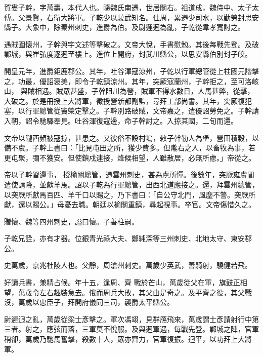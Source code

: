 \begin{pinyinscope}
 賀婁子幹，字萬壽，本代人也。隨魏氏南遷，世居關右。祖道成，魏侍中、太子太傅。父景賢，右衛大將軍。子乾少以驍武知名。仕周，累遷少司水，以勤勞封思安縣子。大象中，除秦州刺史，進爵為伯。及尉遲迥為亂，子乾從韋孝寬討之。



 遇賊圍懷州，子幹與宇文述等擊破之。文帝大悅，手書慰勉。其後每戰先登。及破鄴城，與崔弘度逐迥至樓上。進位上開府，封武川縣公，以思安縣伯別封子皎。



 開皇元年，進爵鉅鹿郡公。其年，吐谷渾寇涼州，子乾以行軍總管從上柱國元諧擊之，功最，優詔褒美，即令子乾鎮涼州。其年，突厥寇蘭州，子幹拒之，至可洛峐山，
 與賊相遇。賊眾甚盛，子幹阻川為營，賊軍不得水數日，人馬甚弊，從擊，大破之。於是冊授上大將軍，徵授營新都副監，尋拜工部尚書。其年，突厥復犯塞，以行軍總管從竇榮定擊之。子幹別路破賊，文帝嘉之，遣優詔勞免之。子幹請入朝，詔令馳驛奉見。吐谷渾復寇邊，命子幹討之。入掠其國，二旬而還。



 文帝以隴西頻被寇掠，甚患之。又彼俗不設村塢，敕子幹勒人為堡，營田積穀，以備不虞。子幹上書曰：「比見屯田之所，獲少費多。但隴右之人，以畜牧為事，若更屯聚，彌不獲安。但使鎮戍連接，烽候相望，人雖散居，必無所慮。」帝從之。



 帝以子幹習邊事，
 授榆關總管，遷雲州刺史，甚為虜所憚。後數年，突厥雍虞閭遣使請降，並獻羊馬。詔以子乾為行軍總管，出西北道應接之。還，拜雲州總管，以突厥所獻馬百匹、羊千口以賜之，乃下書曰：「自公守北門，風塵不警。突厥所獻，還以賜公。」母憂去職。朝廷以榆關重鎮，尋起視事。卒官。文帝傷惜久之。



 贈懷、魏等四州剌史，謚曰懷。子善柱嗣。



 子乾兄詮，亦有才器。位銀青光祿大夫、鄭純深等三州刺史、北地太守、東安郡公。



 史萬歲，京兆杜陵人也。父靜，周滄州刺史。萬歲少英武，善騎射，驍健若飛。



 好讀兵書，兼精占候。年十五，逢周、齊
 戰於芒山，萬歲從父在軍，旗鼓正相望，萬歲令左右趣裝急去。俄而周兵大敗，其父由是奇之。及平齊之役，其父戰沒，萬歲以忠臣子，拜開府儀同三司，襲爵太平縣公。



 尉遲迥之亂，萬歲從梁士彥擊之。軍次馮翊，見群鴈飛來，萬歲謂士彥請射行中第三者。射之，應弦而落，三軍莫不悅服。及與迥軍遇，每戰先登。鄴城之陣，官軍稍卻，萬歲乃馳馬奮擊，殺數十人，眾亦齊力，官軍復振。迥平，以功拜上大將軍。




\end{pinyinscope}

